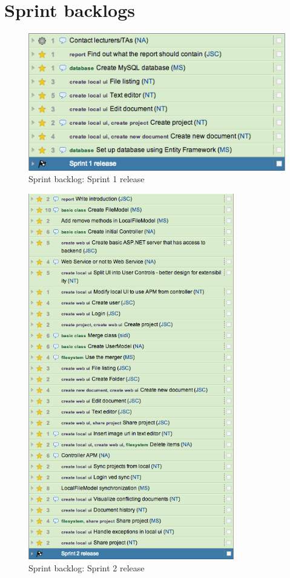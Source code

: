 \section{Sprint backlogs}
\label{sec:sprintbacklogs}

\begin{figure}[htb]
	\centering
	\includegraphics[width=1\textwidth]{Appendices/graphics/sprint_backlog_1.png}
	\caption{Sprint backlog: Sprint 1 release}
	\label{fig:sprint-backlog-1}
\end{figure}

\begin{figure}[htb]
	\centering
	\includegraphics[width=0.8\textwidth]{Appendices/graphics/sprint_backlog_2.png}
	\caption{Sprint backlog: Sprint 2 release}
	\label{fig:sprint-backlog-2}
\end{figure}


